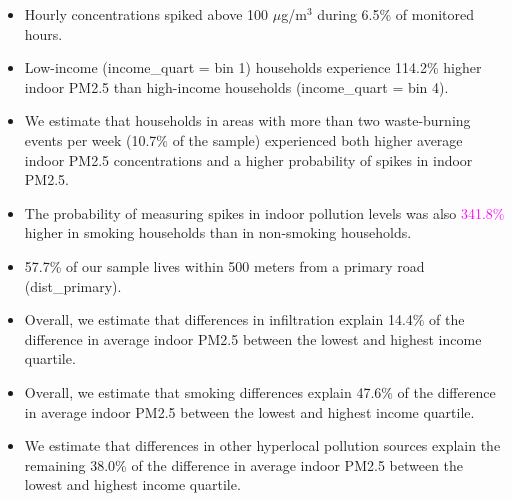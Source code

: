 \begin{itemize}
\item Hourly concentrations spiked above 100 \(\mu\)g/m\(^3\) during 6.5\% of monitored hours.
\item Low-income (income\_quart = bin 1) households experience 114.2\% higher indoor PM2.5 than high-income households (income\_quart = bin 4).
\item We estimate that households in areas with more than two waste-burning events per week (10.7\% of the sample) experienced both higher average indoor PM2.5 concentrations and a higher probability of spikes in indoor PM2.5.
\item The probability of measuring spikes in indoor pollution levels was also \textcolor{magenta}{341.8\%} higher in smoking households than in non-smoking households.
\item 57.7\% of our sample lives within 500 meters from a primary road (dist\_primary).
\item Overall, we estimate that differences in infiltration explain 14.4\% of the difference in average indoor PM2.5 between the lowest and highest income quartile.
\item Overall, we estimate that smoking differences explain 47.6\% of the difference in average indoor PM2.5 between the lowest and highest income quartile.
\item We estimate that differences in other hyperlocal pollution sources explain the remaining 38.0\% of the difference in average indoor PM2.5 between the lowest and highest income quartile.
\end{itemize}
